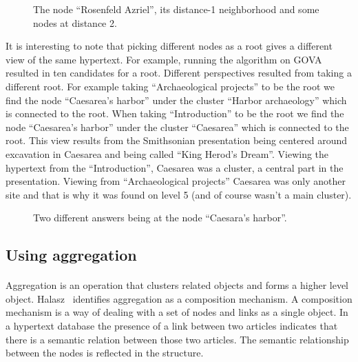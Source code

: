\documentclass[twocolumn,10pt]{article}
\begin{document}
\begin{figure}
\vspace*{8cm}
\caption [10pt] { The node ``Rosenfeld Azriel'', its distance-1
neighborhood and some nodes at distance 2.}
\label{fig:overview}
\end{figure}

It is interesting to note that picking different nodes as a root gives
a different view of the same hypertext. For example, running the
algorithm on GOVA resulted in ten candidates for a root.  Different
perspectives resulted from taking a different root.  For example
taking ``Archaeological projects'' to be the root we find the node
``Caesarea's harbor'' under the cluster ``Harbor archaeology'' which
is connected to the root. When taking ``Introduction'' to be the root
we find the node ``Caesarea's harbor'' under the cluster ``Caesarea''
which is connected to the root. This view results from the Smithsonian
presentation being centered around excavation in Caesarea and being
called ``King Herod's Dream''. Viewing the hypertext from the
``Introduction'', Caesarea was a cluster, a central part in the
presentation. Viewing from ``Archaeological projects'' Caesarea was
only another site and that is why it was found on level 5 (and of
course wasn't a main cluster).

\begin{figure}
\vspace*{8cm}
\caption [10pt] {Two different answers being at the 
node ``Caesara's harbor''.}
\label{fig:caesara}
\end{figure}

\subsection*{Using aggregation}
\paragraph{}
Aggregation is an operation that clusters related objects and forms a
higher level object. Halasz~\cite{hal88} identifies aggregation as a
composition mechanism. A composition mechanism is a way of dealing with
a set of nodes and links as a single object. In a hypertext database the
presence of a link between two articles indicates that there is a 
semantic relation between those two articles. The semantic relationship
between the nodes is reflected in the structure.   
 
\end{document}
